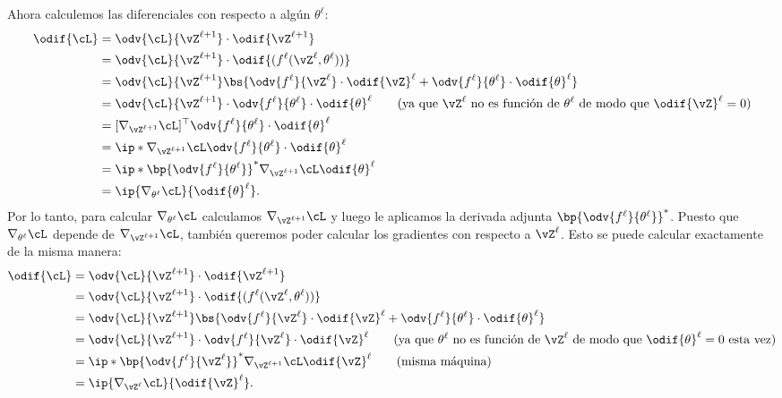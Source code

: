 \documentclass[../../book-main_es.tex]{subfiles}
\begin{document}
Ahora calculemos las diferenciales con respecto a algún \(\theta^{\ell}\):
\begin{align}
    \odif{\cL}
    &= \odv{\cL}{\vZ^{\ell + 1}}\cdot \odif{\vZ^{\ell + 1}} \\
    &= \odv{\cL}{\vZ^{\ell + 1}}\cdot \odif{{(f^{\ell}(\vZ^{\ell},
    \theta^{\ell}))}} \\
    &= \odv{\cL}{\vZ^{\ell +
    1}}\bs{\odv{f^{\ell}}{\vZ^{\ell}}\cdot\odif{\vZ}^{\ell} +
    \odv{f^{\ell}}{\theta^{\ell}}\cdot\odif{\theta}^{\ell}} \\
    &= \odv{\cL}{\vZ^{\ell + 1}}\cdot
    \odv{f^{\ell}}{\theta^{\ell}}\cdot\odif{\theta}^{\ell} \qquad
    \text{(ya que~\(\vZ^{\ell}\) no es función de \(\theta^{\ell}\) de modo que
    \(\odif{\vZ}^{\ell} = 0\))} \\
    &= [\nabla_{\vZ^{\ell +
    1}}\cL]^{\top}\odv{f^{\ell}}{\theta^{\ell}}\cdot\odif{\theta}^{\ell} \\
    &= \ip*{\nabla_{\vZ^{\ell +
    1}}\cL}{\odv{f^{\ell}}{\theta^{\ell}}\cdot\odif{\theta}^{\ell}} \\
    &= \ip*{\bp{\odv{f^{\ell}}{\theta^{\ell}}}^{*}\nabla_{\vZ^{\ell +
    1}}\cL}{\odif{\theta}^{\ell}} \\
    &= \ip{\nabla_{\theta^{\ell}}\cL}{\odif{\theta}^{\ell}}.
\end{align}
Por lo tanto, para calcular \(\nabla_{\theta^{\ell}}\cL\) calculamos
\(\nabla_{\vZ^{\ell + 1}}\cL\) y luego le aplicamos la derivada adjunta
\(\bp{\odv{f^{\ell}}{\theta^{\ell}}}^{*}\). Puesto que
\(\nabla_{\theta^{\ell}}\cL\) depende de \(\nabla_{\vZ^{\ell +
1}}\cL\), también queremos poder calcular los gradientes
con respecto a \(\vZ^{\ell}\). Esto se puede calcular exactamente de la misma manera:
\begin{align}
    \odif{\cL}
    &= \odv{\cL}{\vZ^{\ell + 1}}\cdot \odif{\vZ^{\ell + 1}} \\
    &= \odv{\cL}{\vZ^{\ell + 1}}\cdot\odif{{(f^{\ell}(\vZ^{\ell},
    \theta^{\ell}))}} \\
    &= \odv{\cL}{\vZ^{\ell +
    1}}\bs{\odv{f^{\ell}}{\vZ^{\ell}}\cdot\odif{\vZ}^{\ell} +
    \odv{f^{\ell}}{\theta^{\ell}}\cdot\odif{\theta}^{\ell}} \\
    &= \odv{\cL}{\vZ^{\ell +
    1}}\cdot\odv{f^{\ell}}{\vZ^{\ell}}\cdot\odif{\vZ}^{\ell} \qquad
    \text{(ya que~\(\theta^{\ell}\) no es función de \(\vZ^{\ell}\) de modo que
    \(\odif{\theta}^{\ell} = 0\) esta vez)} \\
    &= \ip*{\bp{\odv{f^{\ell}}{\vZ^{\ell}}}^{*}\nabla_{\vZ^{\ell +
    1}}\cL}{\odif{\vZ}^{\ell}} \qquad \text{(misma máquina)} \\
    &= \ip{\nabla_{\vZ^{\ell}}\cL}{\odif{\vZ}^{\ell}}.
\end{align}
\end{document}
